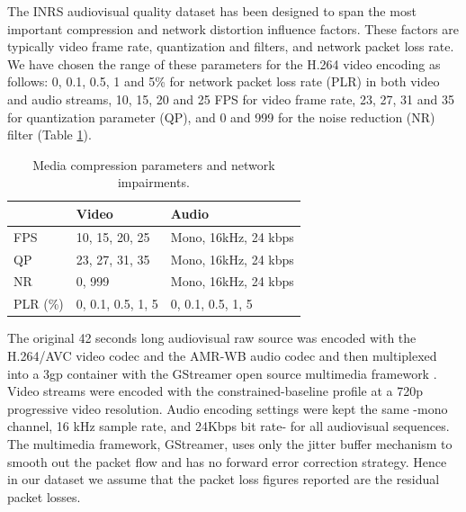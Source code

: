 \documentclass[journal]{IEEEtran}
\begin{document}
The INRS audiovisual quality dataset has been designed to span the most important compression and network distortion influence factors. These factors are typically video frame rate, quantization and filters, and network packet loss rate. We have chosen the range of these parameters for the H.264 video encoding as follows: 0, 0.1, 0.5, 1 and 5\% for network packet loss rate (PLR) in both video and audio streams, 10, 15, 20 and 25 FPS for video frame rate, 23, 27, 31 and 35 for quantization parameter (QP), and 0 and 999 for the noise reduction (NR) filter (Table \ref{tab:dataset_media}).

\begin{table}
\centering
\caption{Media compression parameters and network impairments.}
\label{tab:dataset_media}
\begin{tabular}{|l|l|l|} \hline
& Video & Audio \\ \hline
FPS & 10, 15, 20, 25 & Mono, 16kHz, 24 kbps \\ \hline
QP & 23, 27, 31, 35 & Mono, 16kHz, 24 kbps  \\ \hline
NR & 0, 999 & Mono, 16kHz, 24 kbps \\ \hline
PLR (\%) & 0, 0.1, 0.5, 1, 5 & 0, 0.1, 0.5, 1, 5 \\ \hline
\end{tabular}
\end{table}

The original 42 seconds long audiovisual raw source was encoded with the H.264/AVC video codec and the AMR-WB audio codec and then multiplexed into a 3gp container with the GStreamer open source multimedia framework \cite{teamgstreamer}.  Video streams were encoded with the constrained-baseline profile at a 720p progressive video resolution. Audio encoding settings were kept the same -mono channel, 16 kHz sample rate, and 24Kbps bit rate- for all audiovisual sequences. The multimedia framework, GStreamer, uses only the jitter buffer mechanism to smooth out the packet flow and has no forward error correction strategy. Hence in our dataset we assume that the packet loss figures reported are the residual packet losses.
\end{document}
